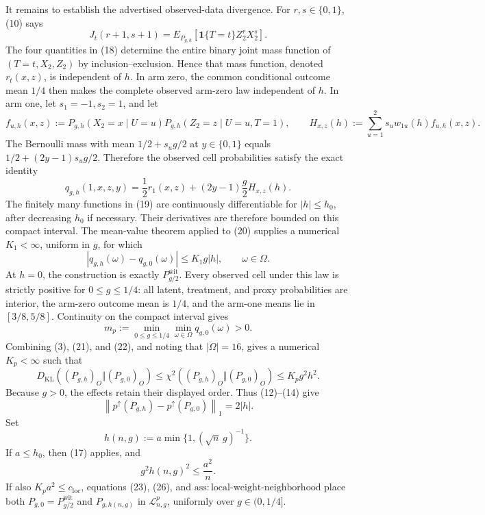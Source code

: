 It remains to establish the advertised observed-data divergence.  For \(r,s\in\{0,1\}\), (10) says
\[
 J_t(r+1,s+1)
 =E_{P_{g,h}}\!\left[\mathbf 1\{T=t\}Z_2^rX_2^s\right].                         \tag{18}
\]
The four quantities in (18) determine the entire binary joint mass function of \((T=t,X_2,Z_2)\) by inclusion--exclusion.  Hence that mass function, denoted \(r_t(x,z)\), is independent of \(h\).  In arm zero, the common conditional outcome mean \(1/4\) then makes the complete observed arm-zero law independent of \(h\).  In arm one, let \(s_1=-1,s_2=1\), and let
\[
 f_{u,h}(x,z):=P_{g,h}(X_2=x\mid U=u)
               P_{g,h}(Z_2=z\mid U=u,T=1),
 \qquad
 H_{x,z}(h):=\sum_{u=1}^2s_u w_{1u}(h)f_{u,h}(x,z).                              \tag{19}
\]
The Bernoulli mass with mean \(1/2+s_ug/2\) at \(y\in\{0,1\}\) equals \(1/2+(2y-1)s_ug/2\).  Therefore the observed cell probabilities satisfy the exact identity
\[
 q_{g,h}(1,x,z,y)
 =\frac12r_1(x,z)+(2y-1)\frac g2 H_{x,z}(h).                                     \tag{20}
\]
The finitely many functions in (19) are continuously differentiable for \(|h|\le h_0\), after decreasing \(h_0\) if necessary.  Their derivatives are therefore bounded on this compact interval.  The mean-value theorem applied to (20) supplies a numerical \(K_1<\infty\), uniform in \(g\), for which
\[
 |q_{g,h}(\omega)-q_{g,0}(\omega)|\le K_1g|h|,
 \qquad \omega\in\Omega.                                                        \tag{21}
\]
At \(h=0\), the construction is exactly \(P_{g/2}^{\mathrm{wit}}\).  Every observed cell under this law is strictly positive for \(0\le g\le1/4\): all latent, treatment, and proxy probabilities are interior, the arm-zero outcome mean is \(1/4\), and the arm-one means lie in \([3/8,5/8]\).  Continuity on the compact interval gives
\[
 m_p:=\min_{0\le g\le1/4}\min_{\omega\in\Omega}q_{g,0}(\omega)>0.             \tag{22}
\]
Combining (3), (21), and (22), and noting that \(|\Omega|=16\), gives a numerical \(K_p<\infty\) such that
\[
 D_{\mathrm{KL}}\!\left((P_{g,h})_O\Vert(P_{g,0})_O\right)
 \le\chi^2\!\left((P_{g,h})_O\Vert(P_{g,0})_O\right)
 \le K_pg^2h^2.                                                                   \tag{23}
\]
Because \(g>0\), the effects retain their displayed order.  Thus (12)--(14) give
\[
 \left\lVert p^\uparrow(P_{g,h})-p^\uparrow(P_{g,0})\right\rVert_1=2|h|.         \tag{24}
\]
Set
\[
 h(n,g):=a\min\{1,(\sqrt n\,g)^{-1}\}.                                          \tag{25}
\]
If \(a\le h_0\), then (17) applies, and
\[
 g^2h(n,g)^2\le\frac{a^2}{n}.                                                     \tag{26}
\]
If also \(K_pa^2\le c_{\mathrm{loc}}\), equations (23), (26), and \(\mathrm{ass:local\text{-}weight\text{-}neighborhood}\) place both \(P_{g,0}=P_{g/2}^{\mathrm{wit}}\) and \(P_{g,h(n,g)}\) in \(\mathcal L_{n,g}^p\), uniformly over \(g\in(0,1/4]\).

